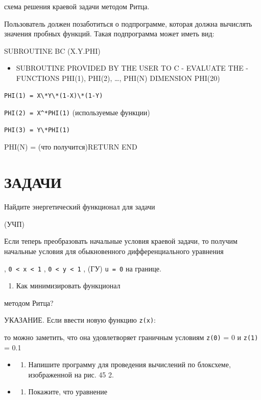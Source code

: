 \documentclass[
  ukrainian,
]{article}
\providecommand{\tightlist}{%
  \setlength{\itemsep}{0pt}\setlength{\parskip}{0pt}}
\begin{document}
схема решения краевой задачи методом Ритца.

Пользователь должен позаботиться о подпрограмме, которая должна
вычислять значения пробных функций. Такая подпрограмма может иметь вид:

SUBROUTINE BC (X.Y.PHI)

\begin{itemize}
\tightlist
\item
  SUBROUTINE PROVIDED BY THE USER TO C - EVALUATE THE - FUNCTIONS
  PHI(1), PHI(2), \ldots, PHI(N) DIMENSION PHI(20)
\end{itemize}

\begin{verbatim}
PHI(1) = X\*Y\*(1-X)\*(1-Y)
\end{verbatim}

\texttt{PHI(2)\ =\ X\^{}*PHI(1)} (используемые функции)

\begin{verbatim}
PHI(3) = Y\*PHI(1)
\end{verbatim}

PHI(N) = (что получится)RETURN END

\section{\texorpdfstring{\textbf{ЗА}ДАЧИ}{ЗАДАЧИ}}\label{ux437ux430ux434ux430ux447ux438-2}

Найдите энергетический функционал для задачи

(УЧП)

Если теперь преобразовать начальные условия краевой задачи, то получим
начальные условия для обыкновенного дифференциального уравнения

, \texttt{0\ \textless{}\ x\ \textless{}\ 1} ,
\texttt{0\ \textless{}\ y\ \textless{}\ 1} , (ГУ) \texttt{u\ =\ 0} на
границе.

\begin{enumerate}
\def\labelenumi{\arabic{enumi}.}
\setcounter{enumi}{1}
\tightlist
\item
  Как минимизировать функционал
\end{enumerate}

методом Ритца?

УКАЗАНИЕ. Если ввести новую функцию \texttt{z(x)}:

то можно заметить, что она удовлетворяет граничным условиям
\texttt{z(0)} = 0 и \texttt{z(1)} = 0.1

\begin{itemize}
\tightlist
\item
  \begin{enumerate}
  \def\labelenumi{\arabic{enumi}.}
  \setcounter{enumi}{2}
  \tightlist
  \item
    Напишите программу для проведения вычислений по блоксхеме,
    изображенной на рис. 45 2.
  \end{enumerate}
\item
  \begin{enumerate}
  \def\labelenumi{\arabic{enumi}.}
  \setcounter{enumi}{3}
  \tightlist
  \item
    Покажите, что уравнение
  \end{enumerate}
\end{itemize}
\end{document}
